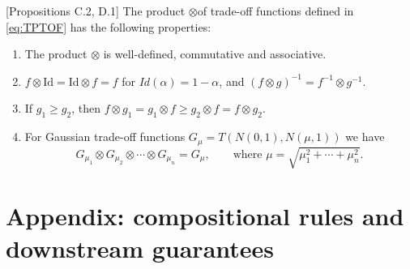 \begin{proposition} \citet{dong2022gaussian}[Propositions C.2, D.1]
\label{prop:tensor-basic-properties}
The product \(\otimes\)of trade-off functions  defined in \ref{eq:TPTOF} has the following properties:
\begin{enumerate}
    \item The product \(\otimes\) is well-defined, commutative and associative.
    \item \(f \otimes \mathrm{Id} = \mathrm{Id} \otimes f = f\) for $Id(\alpha)= 1-\alpha$, and \((f \otimes g)^{-1} = f^{-1} \otimes g^{-1}\). 
    \item If \(g_1 \geq g_2\), then \(f \otimes g_1 =g_1\otimes f \geq   g_2\otimes f= f \otimes g_2\).
    \item For Gaussian trade-off functions $G_{\mu}= T(N(0,1), N(\mu, 1))$ we have
    \begin{equation}
        G_{\mu_1} \otimes G_{\mu_2} \otimes \cdots \otimes G_{\mu_n}
        =
        G_{\mu},
        \qquad
        \text{where }
        \mu = \sqrt{\mu_1^2+\cdots+\mu_n^2}.
    \end{equation}
\end{enumerate}
\end{proposition}
\section{Appendix: compositional rules and downstream guarantees}
